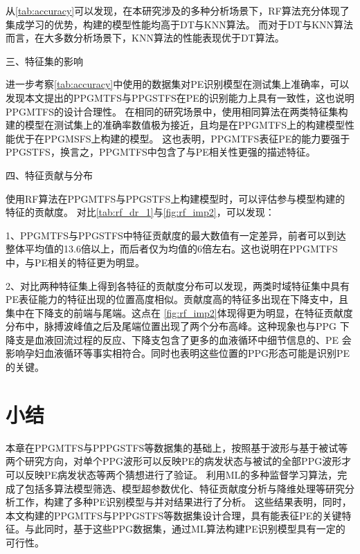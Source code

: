 从\autoref{tab:accuracy}可以发现，在本研究涉及的多种分析场景下，RF算法充分体现了集成学习的优势，构建的模型性能均高于DT与KNN算法。
而对于DT与KNN算法而言，在大多数分析场景下，KNN算法的性能表现优于DT算法。

三、特征集的影响

进一步考察\autoref{tab:accuracy}中使用的数据集对PE识别模型在测试集上准确率，可以发现本文提出的PPGMTFS与PPGSTFS在PE的识别能力上具有一致性，这也说明PPGMTFS的设计合理性。
在相同的研究场景中，使用相同算法在两类特征集构建的模型在测试集上的准确率数值极为接近，且均是在PPGMTFS上的构建模型性能优于在PPGMSFS上构建的模型。
这也表明，PPGMTFS表征PE的能力要强于PPGSTFS，换言之，PPGMTFS中包含了与PE相关性更强的描述特征。

四、特征贡献与分布

使用RF算法在PPGMTFS与PPGSTFS上构建模型时，可以评估参与模型构建的特征的贡献度。
对比\autoref{tab:rf_dr_1}与\autoref{fig:rf_imp2}，可以发现：

1、PPGMTFS与PPGSTFS中特征贡献度的最大数值有一定差异，前者可以到达整体平均值的13.6倍以上，而后者仅为均值的6倍左右。这也说明在PPGMTFS中，与PE相关的特征更为明显。

2、对比两种特征集上得到各特征的贡献度分布可以发现，两类时域特征集中具有PE表征能力的特征出现的位置高度相似。贡献度高的特征多出现在下降支中，且集中在下降支的前端与尾端。这点在
\autoref{fig:rf_imp2}体现得更为明显，在特征贡献度分布中，脉搏波峰值之后及尾端位置出现了两个分布高峰。这种现象也与PPG
下降支是血液回流过程的反应、下降支包含了更多的血液循环中细节信息的、PE
会影响孕妇血液循环等事实相符合。同时也表明这些位置的PPG形态可能是识别PE的关键。

\section{小结}
本章在PPGMTFS与PPPGSTFS等数据集的基础上，按照基于波形与基于被试等两个研究方向，对单个PPG波形可以反映PE的病发状态与被试的全部PPG波形才可以反映PE病发状态等两个猜想进行了验证。
利用ML的多种监督学习算法，完成了包括多算法模型筛选、模型超参数优化、特征贡献度分析与降维处理等研究分析工作，构建了多种PE识别模型与并对结果进行了分析。
这些结果表明，同时，本文构建的PPGMTFS与PPPGSTFS等数据集设计合理，具有能表征PE的关键特征。与此同时，基于这些PPG数据集，通过ML算法构建PE识别模型具有一定的可行性。
